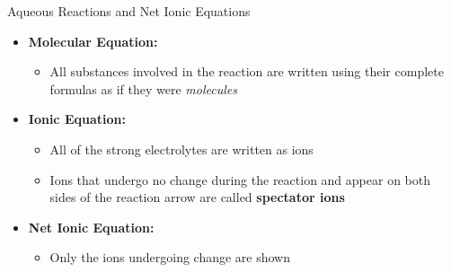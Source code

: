 \documentclass[handout]{beamer}
\begin{document}
\begin{frame}{Aqueous Reactions and Net Ionic Equations}
	\begin{center}
	\end{center}

	\begin{itemize}
		\item \textbf{Molecular Equation:}
			\begin{itemize}
				\item All substances involved in the reaction
					are written using their complete
					formulas as if they were
					\emph{molecules}
			\end{itemize}
			\pause
		\item \textbf{Ionic Equation:}
			\begin{itemize}
				\item All of the strong electrolytes are written
					as ions
				\pause
				\item Ions that undergo no change during the reaction
					and appear on both sides of the reaction arrow
					are called \textbf{spectator ions}
			\end{itemize}
			\pause
		\item \textbf{Net Ionic Equation:}
			\begin{itemize}
				\item Only the ions undergoing change are shown
			\end{itemize}
	\end{itemize}
\end{frame}
\end{document}
